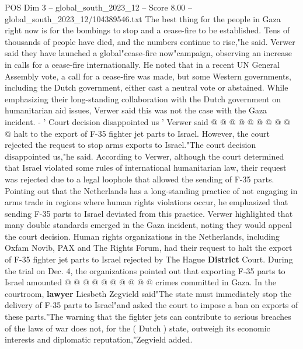 \begin{textsample}{POS Dim 3 – global\_south\_2023\_12 – Score 8.00 – global\_south\_2023\_12/104389546.txt}
The best thing for the people in Gaza right now is for the bombings to stop and a cease-fire to be established.
Tens of thousands of people have died, and the numbers continue to rise,"he said.
Verwer said they have launched a global"cease-fire now"campaign, observing an increase in calls for a cease-fire internationally.
He noted that in a recent UN General Assembly vote, a call for a cease-fire was made, but some Western governments, including the Dutch government, either cast a neutral vote or abstained.
While emphasizing their long-standing collaboration with the Dutch government on humanitarian aid issues, Verwer said this was not the case with the Gaza incident. - ' Court decision disappointed us ' Verwer said @ @ @ @ @ @ @ @ @ @ halt to the export of F-35 fighter jet parts to Israel.
However, the court rejected the request to stop arms exports to Israel."The court decision disappointed us,"he said.
According to Verwer, although the court determined that Israel violated some rules of international humanitarian law, their request was rejected due to a legal loophole that allowed the sending of F-35 parts.
Pointing out that the Netherlands has a long-standing practice of not engaging in arms trade in regions where human rights violations occur, he emphasized that sending F-35 parts to Israel deviated from this practice.
Verwer highlighted that many double standards emerged in the Gaza incident, noting they would appeal the court decision.
Human rights organizations in the Netherlands, including Oxfam Novib, PAX and The Rights Forum, had their request to halt the export of F-35 fighter jet parts to Israel rejected by The Hague \textbf{District} Court.
During the trial on Dec. 4, the organizations pointed out that exporting F-35 parts to Israel amounted @ @ @ @ @ @ @ @ @ @ crimes committed in Gaza.
In the courtroom, \textbf{lawyer} Liesbeth Zegvield said"The state must immediately stop the delivery of F-35 parts to Israel"and asked the court to impose a ban on exports of these parts."The warning that the fighter jets can contribute to serious breaches of the laws of war does not, for the ( Dutch ) state, outweigh its economic interests and diplomatic reputation,"Zegvield added.

\end{textsample}
